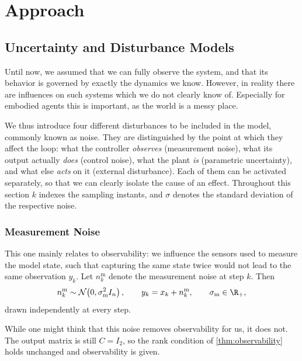 \section{Approach}
\label{sec:approach}

\subsection{Uncertainty and Disturbance Models}
\label{subsec:uncertainty}

Until now, we assumed that we can fully observe the system, and that its
behavior is governed by exactly the dynamics we know. However, in reality there
are influences on such systems which we do not clearly know of. Especially for
embodied agents this is important, as the world is a messy place.

We thus introduce four different disturbances to be included in the model,
commonly known as noise. They are distinguished by the point at which they
affect the loop: what the controller \emph{observes} (measurement noise),
what its output actually \emph{does} (control noise), what the plant
\emph{is} (parametric uncertainty), and what else \emph{acts} on it
(external disturbance). Each of them can be activated separately, so that we
can clearly isolate the cause of an effect. Throughout this section
$k$ indexes the sampling instants, and $\sigma$ denotes the standard deviation
of the respective noise.

\subsubsection{Measurement Noise}
\label{subsubsec:measurement-noise}

This one mainly relates to observability: we influence the sensors used to measure
the model state, such that capturing the same state twice would
not lead to the same observation $y_k$. 
Let $n^{\mathrm{m}}_k$ denote the measurement noise at step $k$. Then
\begin{equation}
    \label{eq:measurement-noise}
    n^{\mathrm{m}}_k \sim \mathcal{N}\!\left(0, \sigma_{\mathrm{m}}^{2} I_n\right),
    \qquad
    y_k = x_k + n^{\mathrm{m}}_k ,
    \qquad \sigma_{\mathrm{m}} \in \R_{+} ,
\end{equation}
drawn independently at every step.

While one might think that this noise removes observability for us, it does not.
The output matrix is still $C = I_2$, 
so the rank condition of \cref{thm:observability} holds
unchanged and observability is given. 


